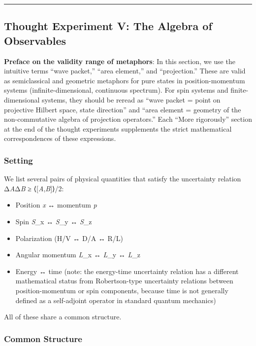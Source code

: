 \documentclass[
  11pt,
]{article}
\providecommand{\tightlist}{%
  \setlength{\itemsep}{0pt}\setlength{\parskip}{0pt}}
\begin{document}
\begin{center}\rule{0.5\linewidth}{0.5pt}\end{center}

\subsection{Thought Experiment V: The Algebra of
Observables}\label{thought-experiment-v-the-algebra-of-observables}

\textbf{Preface on the validity range of metaphors}: In this section, we
use the intuitive terms ``wave packet,'' ``area element,'' and
``projection.'' These are valid as semiclassical and geometric metaphors
for pure states in position-momentum systems (infinite-dimensional,
continuous spectrum). For spin systems and finite-dimensional systems,
they should be reread as ``wave packet = point on projective Hilbert
space, state direction'' and ``area element = geometry of the
non-commutative algebra of projection operators.'' Each ``More
rigorously'' section at the end of the thought experiments supplements
the strict mathematical correspondences of these expressions.

\subsubsection{Setting}\label{setting-4}

We list several pairs of physical quantities that satisfy the
uncertainty relation Δ\emph{A}Δ\emph{B} ≥
\textbar⟨{[}\emph{A},\emph{B}{]}⟩\textbar/2:

\begin{itemize}
\tightlist
\item
  Position \emph{x} ↔ momentum \emph{p}
\item
  Spin \emph{S}\_x ↔ \emph{S}\_y ↔ \emph{S}\_z
\item
  Polarization (H/V ↔ D/A ↔ R/L)
\item
  Angular momentum \emph{L}\_x ↔ \emph{L}\_y ↔ \emph{L}\_z
\item
  Energy ↔ time (note: the energy-time uncertainty relation has a
  different mathematical status from Robertson-type uncertainty
  relations between position-momentum or spin components, because time
  is not generally defined as a self-adjoint operator in standard
  quantum mechanics)
\end{itemize}

All of these share a common structure.

\subsubsection{Common Structure}\label{common-structure}
\end{document}
